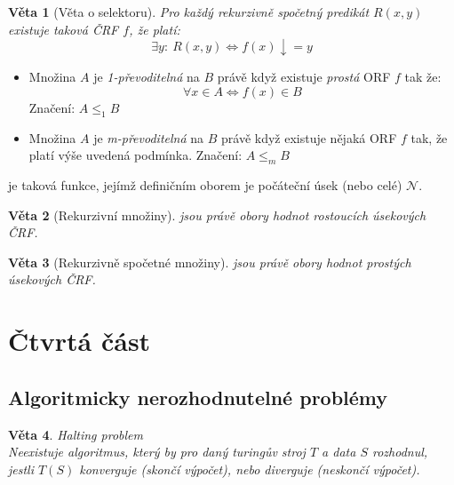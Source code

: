 \documentclass[a4paper]{article}      %
\newtheorem{theorem}{Věta}[section]
\newenvironment{definition}[1][Definice]{\begin{trivlist}
\item[\hskip \labelsep {\bfseries #1}]}{\end{trivlist}}
\begin{document}
\begin{theorem}[Věta o selektoru]
Pro každý rekurzivně spočetný predikát $R(x,y)$ existuje taková ČRF $f$, že platí:
\[
\exists y:\ R(x,y) \Leftrightarrow f(x)\downarrow = y
\]
\end{theorem}

\begin{definition}[Převoditelnost.]
\begin{itemize}
\item Množina $A$ je \emph{1-převoditelná} na $B$ právě když existuje \emph{prostá} ORF $f$ tak že:
\[
\forall x \in A \Leftrightarrow f(x) \in B
\]
Značení: $A \leq_{1} B$ 
\item Množina $A$ je \emph{m-převoditelná} na $B$ právě když existuje nějaká ORF $f$ tak, že platí výše uvedená podmínka.
Značení: $A \leq_{m} B$
\end{itemize}
\end{definition}

\begin{definition}[Úseková funkce]
je taková funkce, jejímž definičním oborem je počáteční úsek (nebo celé) $\mathcal{N}$.
\end{definition}

\begin{theorem}[Rekurzivní množiny]
jsou právě obory hodnot rostoucích úsekových ČRF.
\end{theorem}

\begin{theorem}[Rekurzivně spočetné množiny]
jsou právě obory hodnot prostých úsekových ČRF.
\end{theorem}

\section{Čtvrtá část}

\subsection{Algoritmicky nerozhodnutelné problémy}

\begin{theorem} \emph{Halting problem}\\
Neexistuje algoritmus, který by pro daný turingův stroj $T$ a data $S$ rozhodnul, jestli $T(S)$ konverguje (skončí výpočet), nebo diverguje (neskončí výpočet).
\end{theorem}
\end{document}
